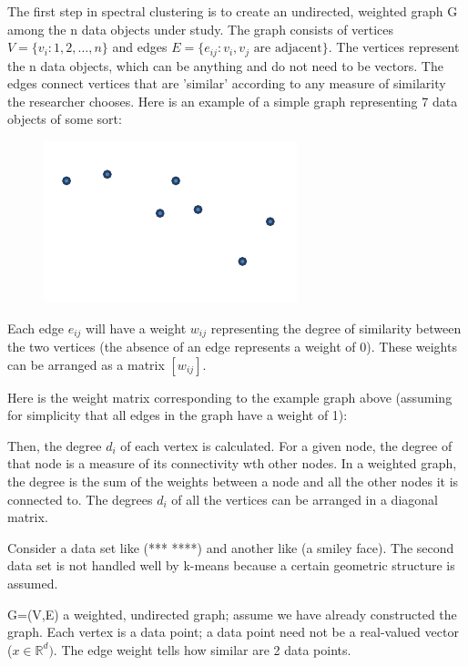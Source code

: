 \documentclass[11pt]{article}
\begin{document}
The first step in spectral clustering is to create an undirected, weighted graph G among the n data objects under study.  The graph consists of vertices $V=\{v_i:1,2,\dots,n\}$ and edges $E=\{e_{ij}:v_i, v_j \text{ are adjacent}\}$.  The vertices represent the n data objects, which can be anything and do not need to be vectors.  The edges connect vertices that are 'similar' according to any measure of similarity the researcher chooses.  Here is an example of a simple graph representing 7 data objects of some sort:

\begin{figure}
\includegraphics{graph_0}
\caption{}
\end{figure}

Each edge $e_{ij}$ will have a weight $w_{ij}$ representing the degree of similarity between the two vertices (the absence of an edge represents a weight of 0).  These weights can be arranged as a matrix $[w_{ij}]$.

Here is the weight matrix corresponding to the example graph above (assuming for simplicity that all edges in the graph have a weight of 1):

Then, the degree $d_i$ of each vertex is calculated.  For a given node, the degree of that node is a measure of its connectivity wth other nodes.  In a weighted graph, the degree is the sum of the weights between a node and all the other nodes it is connected to.  The degrees $d_i$ of all the vertices can be arranged in a diagonal matrix.


Consider a data set like (***    ****) and another like (a smiley face).  The second data set is not handled well by k-means because a certain geometric structure is assumed.


G=(V,E) a weighted, undirected graph; assume we have already constructed the graph.
Each vertex is a data point; a data point need not be a real-valued vector ($x \in \mathbb{R}^d)$.
The edge weight tells how similar are 2 data points.
\end{document}
